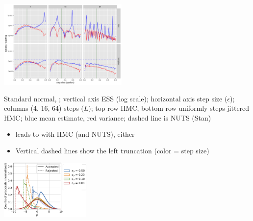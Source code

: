 \documentclass[10pt]{report}
\begin{document}
\begin{center}
  \vspace*{-4pt}
  \includegraphics[width=2.5in]{img/hmc-harmonics.png}
\end{center}
\begin{subitemize}
  \vspace*{-8pt}
\item Standard normal, ;
  vertical axis ESS (log scale); horizontal axis step size
  ($\epsilon$); columns (4, 16, 64) steps ($L$);
  top row HMC, bottom row uniformly steps-jittered HMC;
  blue mean estimate, red variance; dashed line is NUTS (Stan)
\end{subitemize}

\begin{itemize}
\item {} leads to 
  with HMC (and NUTS), either
  \item Vertical dashed lines show the left truncation (color = step size)
\end{itemize}
\begin{center}
  \includegraphics[width=1.75in]{img/hmc-rejections.png}
\end{center}
\end{document}
